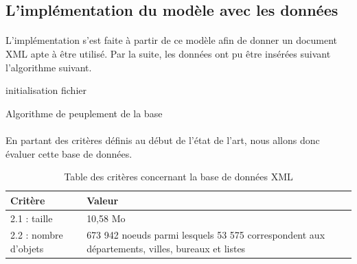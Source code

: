 \subsection{L'implémentation du modèle avec les données}
\paragraph{}L'implémentation s'est faite à partir de ce modèle afin de donner un document XML apte à être utilisé. Par la suite, les données ont pu être insérées suivant l'algorithme suivant.

\begin{algorithm}[H]
 initialisation fichier\;
 \caption{Algorithme de peuplement de la base}
\end{algorithm}

\paragraph{}En partant des critères définis au début de l'état de l'art, nous allons donc évaluer cette base de données.
\begin{table}[h!]
    \centering
	\begin{tabular}{|p{3cm}|p{9cm}|} 
  	\hline
  	\textbf{Critère} & \textbf{Valeur} \\
  	\hline
  	2.1 : taille & 10,58 Mo \\
  	\hline
  	2.2 : nombre d'objets & 673 942 noeuds parmi lesquels 53 575 correspondent aux départements, villes, bureaux et listes \\
  	\hline
	\end{tabular}
    \caption{Table des critères concernant la base de données XML}
    \label{tab:critere-xmlbase}
\end{table}
